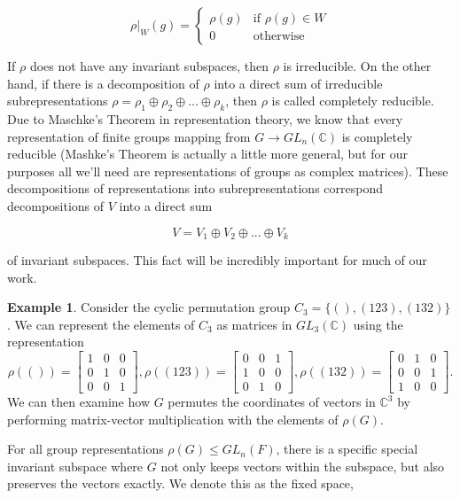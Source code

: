 \documentclass[11pt]{article} %
\theoremstyle{definition}
\newtheorem*{example}{Example}
\theoremstyle{remark}
\begin{document}
\[ \rho|_W(g) = \begin{cases}
	\rho(g) & \textrm{if } \rho(g) \in W \\
	0 & \textrm{otherwise}
	\end{cases}
\]

If $\rho$ does not have any invariant subspaces, then $\rho$ is irreducible. On the other hand, if there is a decomposition of $\rho$ into a direct sum of irreducible subrepresentations $\rho = \rho_1 \oplus \rho_2 \oplus ... \oplus \rho_k$, then $\rho$ is called completely reducible. Due to Maschke's Theorem in representation theory, we know that every representation of finite groups mapping from $G \to GL_n(\mathbb{C})$ is completely reducible (Mashke's Theorem is actually a little more general, but for our purposes all we'll need are representations of groups as complex matrices). These decompositions of representations into subrepresentations correspond decompositions of $V$ into a direct sum

\[ V = V_1 \oplus V_2 \oplus ... \oplus V_k \]

of invariant subspaces. This fact will be incredibly important for much of our work.

\begin{example} 
Consider the cyclic permutation group $C_3 = \lbrace (), (123), (132) \rbrace$. We can represent the elements of $C_3$ as matrices in $GL_3(\mathbb{C})$ using the representation
\[ \rho(()) = \begin{bmatrix}
	1 & 0 & 0 \\
	0 & 1 & 0 \\
	0 & 0 & 1
	\end{bmatrix},
\rho((123)) = \begin{bmatrix}
	0 & 0 & 1 \\
	1 & 0 & 0 \\
	0 & 1 & 0
	\end{bmatrix},
\rho((132)) = \begin{bmatrix}
	0 & 1 & 0 \\
	0 & 0 & 1 \\
	1 & 0 & 0
	\end{bmatrix}.
\]
We can then examine how $G$ permutes the coordinates of vectors in $\mathbb{C}^3$ by performing matrix-vector multiplication with the elements of $\rho(G)$.
\end{example}

For all group representations $\rho(G) \leq GL_n(F)$, there is a specific special invariant subspace where $G$ not only keeps vectors within the subspace, but also preserves the vectors exactly. We denote this as the fixed space,
\end{document}
